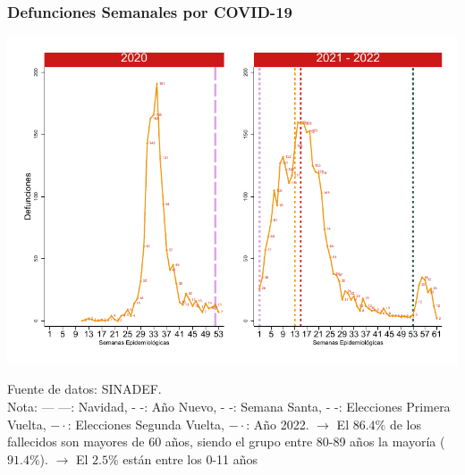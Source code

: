 \documentclass[xcolor=table]{beamer}
\begin{document}
	
	\begin{frame}
		\frametitle{Defunciones Semanales por COVID-19}
		\vspace{-.5cm}
		\begin{center}
			\includegraphics[width=0.9\linewidth, trim={0cm .5cm 0cm 0.2cm},clip]{../figuras/defunciones_20_21_22.pdf}
		\end{center}
		{\tiny Fuente de datos: SINADEF.\\
		Nota: {\color{mycolor1} --- ---: Navidad}, {\color{mycolor1} - -: Año Nuevo}, {\color{mycolor2} - -: Semana Santa}, {\color{mycolor3} - -: Elecciones Primera Vuelta}, {\color{mycolor4} $- \cdot$: Elecciones Segunda Vuelta},
		{\color{mycolor7} $- \cdot$: Año 2022}. 
	$\rightarrow$ El $86.4\%$ de los fallecidos son mayores de 60 años, siendo el grupo entre 80-89 años la mayoría ($91.4\%$).
	$\rightarrow$ El $2.5\%$ están entre los 0-11 años\\}
	\end{frame}
	
\end{document}
